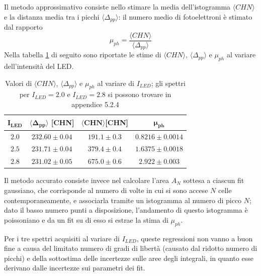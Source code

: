 Il metodo approssimativo consiste nello stimare la media dell'istogramma $\langle CHN\rangle$ e la distanza media tra i picchi $\langle\Delta_{pp}\rangle$: il numero medio di fotoelettroni è stimato dal rapporto
$$\mu_{ph} = \frac{\langle CHN\rangle}{\langle\Delta_{pp}\rangle}$$
Nella tabella \ref{tab:I} di seguito sono riportate le stime di $\langle CHN\rangle$, $\langle\Delta_{pp}\rangle$ e $\mu_{ph}$ al variare dell'intensità del LED.

\begin{table}[H]
\centering
    \begin{tabular}{|c|c|c|c|}
    \hline
    $\mathbf{I_{LED}}$ & $\mathbf{\langle \Delta_{pp}\rangle}$ \textbf{[CHN]} & $\mathbf{\langle CHN \rangle} $\textbf{[CHN]} &$ \mathbf{\mu_{ph}}$ \\
	\hline
    $2.0$ &$ 232.60\pm0.04 $ &$191.1\pm0.3$ &$0.8216\pm0.0014$ \\
    \hline
    $2.5$ &$231.71\pm0.04$ &$379.4\pm0.4$ &$1.6375\pm0.0018$ \\
    \hline
    $2.8$ &$231.02\pm0.05$ &$675.0\pm0.6$ &$2.922\pm0.003$ \\
    \hline
    \end{tabular}
    \caption{\footnotesize Valori di $\langle CHN\rangle$, $\langle\Delta_{pp}\rangle$ e $\mu_{ph}$ al variare di $I_{LED}$; gli spettri per $I_{LED} = 2.0$ e $I_{LED} = 2.8$ si possono trovare in appendice 5.2.4}
    \label{tab:I}
\end{table}
Il metodo accurato consiste invece nel calcolare l'area $A_N$ sottesa a ciascun fit gaussiano, che corrisponde al numero di volte in cui si sono accese $N$ celle contemporaneamente, e associarla tramite un istogramma al numero di picco $N$; dato il basso numero punti a disposizione, l'andamento di questo istogramma è poissoniano e da un fit su di esso si estrae la stima di $\mu_{ph}$.

Per i tre spettri acquisiti al variare di $I_{LED}$, queste regressioni non vanno a buon fine a causa del limitato numero di gradi di libertà (causato dal ridotto numero di picchi) e della sottostima delle incertezze sulle aree degli integrali, in quanto esse derivano dalle incertezze sui parametri dei fit.


